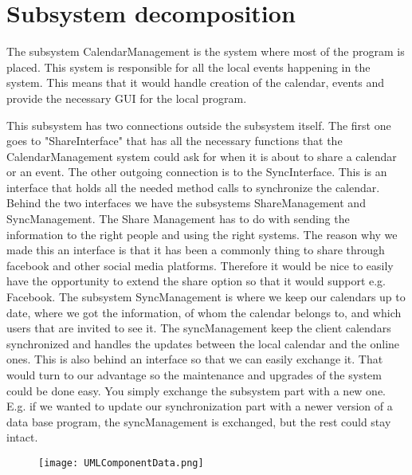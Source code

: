 \section{Subsystem decomposition}
The subsystem CalendarManagement is the system where most of the program is placed. This system is responsible for all the local events happening in the system. This means that it would handle creation of the calendar, events and provide the necessary GUI for the local program. 

This subsystem has two connections outside the subsystem itself. The first one goes to "ShareInterface" that has all the necessary functions that the CalendarManagement system could ask for when it is about to share a calendar or an event. The other outgoing connection is to the SyncInterface. This is an interface that holds all the needed method calls to synchronize the calendar. Behind the two interfaces we have the subsystems ShareManagement and SyncManagement. 
\newline
\newline
The Share Management has to do with sending the information to the right people and using the right systems. The reason why we made this an interface is that it has been a commonly thing to share through facebook and other social media platforms. Therefore it would be nice to easily have the opportunity to extend the share option so that it would support e.g. Facebook. 
\newline
\newline
The subsystem SyncManagement is where we keep our calendars up to date, where we got the information, of whom the calendar belongs to, and which users that are invited to see it. The syncManagement keep the client calendars synchronized and handles the updates between the local calendar and the online ones. This is also behind an interface so that we can easily exchange it. That would turn to our advantage so the maintenance and upgrades of the system could be done easy. You simply exchange the subsystem part with a new one. E.g. if we wanted to update our synchronization part with a newer version of a data base program, the syncManagement is exchanged, but the rest could stay intact. 
\newline
\begin{figure}[h]
\centering
\texttt{[image: UMLComponentData.png]}
\label{figur:UMLComponentData}
\end{figure}